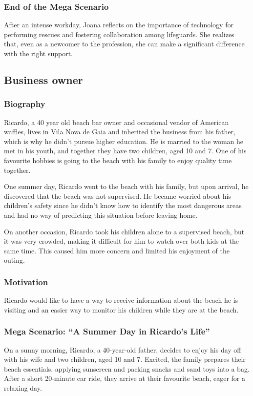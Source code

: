 \subsubsection{\textbf{End of the Mega Scenario}}
After an intense workday, Joana reflects on the importance of technology for performing rescues and fostering collaboration among lifeguards. She realizes that, even as a newcomer to the profession, she can make a significant difference with the right support.


\subsection{Business owner}
\subsubsection{ \textbf{Biography}}
Ricardo, a 40 year old beach bar owner and occasional vendor of American waffles, lives in Vila Nova de Gaia and inherited the business from his father, which is why he didn’t pursue higher education. He is married to the woman he met in his youth, and together they have two children, aged 10 and 7. One of his favourite hobbies is going to the beach with his family to enjoy quality time together.

One summer day, Ricardo went to the beach with his family, but upon arrival, he discovered that the beach was not supervised. He became worried about his children's safety since he didn’t know how to identify the most dangerous areas and had no way of predicting this situation before leaving home.

On another occasion, Ricardo took his children alone to a supervised beach, but it was very crowded, making it difficult for him to watch over both kids at the same time. This caused him more concern and limited his enjoyment of the outing.
\subsubsection{\textbf{Motivation}}
Ricardo would like to have a way to receive information about the beach he is visiting and an easier way to monitor his children while they are at the beach.

\subsubsection{\textbf{Mega Scenario: ``A Summer Day in Ricardo's Life''}}
On a sunny morning, Ricardo, a 40-year-old father, decides to enjoy his day off with his wife and two children, aged 10 and 7. Excited, the family prepares their beach essentials, applying sunscreen and packing snacks and sand toys into a bag. After a short 20-minute car ride, they arrive at their favourite beach, eager for a relaxing day.

